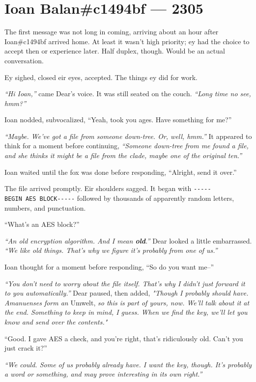 \chapter*{Ioan Balan\#c1494bf — 2305}

The first message was not long in coming, arriving about an hour after Ioan\#c1494bf arrived home. At least it wasn't high priority; ey had the choice to accept then or experience later. Half duplex, though. Would be an actual conversation.

Ey sighed, closed eir eyes, accepted. The things ey did for work.

\emph{``Hi Ioan,''} came Dear's voice. It was still seated on the couch. \emph{``Long time no see, hmm?''}

Ioan nodded, subvocalized, ``Yeah, took you ages. Have something for me?''

\emph{``Maybe. We've got a file from someone down-tree. Or, well, hmm.''} It appeared to think for a moment before continuing, \emph{``Someone down-tree from me found a file, and she thinks it might be a file from the clade, maybe one of the original ten.''}

Ioan waited until the fox was done before responding, ``Alright, send it over.''

The file arrived promptly. Eir shoulders sagged. It began with \texttt{-\/-\/-\/-\/-BEGIN\ AES\ BLOCK-\/-\/-\/-\/-} followed by thousands of apparently random letters, numbers, and punctuation.

``What's an AES block?''

\emph{``An old encryption algorithm. And I mean \textbf{old}.''} Dear looked a little embarrassed. \emph{``We like old things. That's why we figure it's probably from one of us.''}

Ioan thought for a moment before responding, ``So do you want me--''

\emph{``You don't need to worry about the file itself. That's why I didn't just forward it to you automatically.''} Dear paused, then added, \emph{"Though I probably should have. Amanuenses form an} Umwelt, \emph{so this is part of yours, now. We'll talk about it at the end. Something to keep in mind, I guess. When we find the key, we'll let you know and send over the contents."}

``Good. I gave AES a check, and you're right, that's ridiculously old. Can't you just crack it?''

\emph{``We could. Some of us probably already have. I want the key, though. It's probably a word or something, and may prove interesting in its own right.''}

